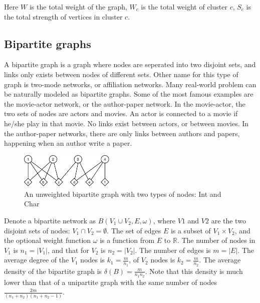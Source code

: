 Here $W$ is the total weight of the graph, $W_c$ is the total weight of cluster $c$,
$S_c$ is the total strength of vertices in cluster $c$.



\subsection{Bipartite graphs}

A bipartite graph is a graph where nodes are seperated into two disjoint sets,
and links only exists between nodes of different sets.
Other name for this type of graph is two-mode networks, or affiliation networks.
Many real-world problem can be naturally modeled as bipartite graphs.
Some of the most famous examples are the movie-actor network, or the author-paper network.
In the movie-actor, the two sets of nodes are actors and movies.
An actor is connected to a movie if he/she play in that movie.
No links exist between actors, or between movies.
In the author-paper networks, there are only links between authors and papers,
happening when an author write a paper.

\begin{figure}[H]
	\centering
	\includegraphics[width=0.4\textwidth]{images/unweighted-bipartite.pdf}
	\caption{An unweighted bipartite graph with two types of nodes: Int and Char}
	\label{fig:unweighted-bipartite-graph}
\end{figure}

Denote a bipartite network as $B(V_1 \cup V_2, E, \omega)$,
where $V1$ and $V2$ are the two disjoint sets of nodes: $V_1 \cap V_2 = \emptyset$.
The set of edges $E$ is a subset of $V_1 \times V_2$,
and the optional weight function $\omega$ is a function from $E$ to $\mathbb{R}$.
The number of nodes in $V_1$ is $n_1 = |V_1|$, and that for $V_2$ is $n_2 = |V_2|$.
The number of edges is $m = |E|$.
The average degree of the $V_1$ nodes is $k_1 = \frac{m}{n_1}$, of $V_2$ nodes is $k_2 = \frac{m}{n_2}$.
The average density of the bipartite graph is $\delta(B) = \frac{m}{n_1 n_2}$.
Note that this density is much lower than that of a unipartite graph with the same number of nodes $\frac{2m}{(n_1 + n_2)(n_1 + n_2 - 1)}$.

